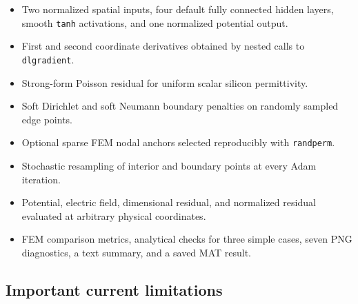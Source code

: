 \documentclass[11pt]{article}
\begin{document}
\begin{itemize}[leftmargin=*]
  \item Two normalized spatial inputs, four default fully connected hidden layers, smooth \texttt{tanh} activations, and one normalized potential output.
  \item First and second coordinate derivatives obtained by nested calls to \texttt{dlgradient}.
  \item Strong-form Poisson residual for uniform scalar silicon permittivity.
  \item Soft Dirichlet and soft Neumann boundary penalties on randomly sampled edge points.
  \item Optional sparse FEM nodal anchors selected reproducibly with \texttt{randperm}.
  \item Stochastic resampling of interior and boundary points at every Adam iteration.
  \item Potential, electric field, dimensional residual, and normalized residual evaluated at arbitrary physical coordinates.
  \item FEM comparison metrics, analytical checks for three simple cases, seven PNG diagnostics, a text summary, and a saved MAT result.
\end{itemize}

\subsection{Important current limitations}
\end{document}
